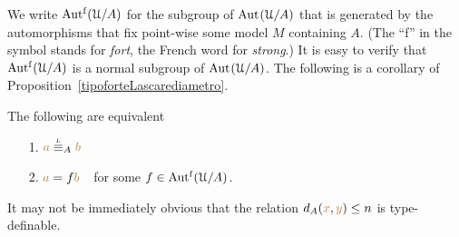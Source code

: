 We write \emph{$\mbox{Aut$^{\rm f}$}(\EuScript U/A)$\/} for the subgroup of ${\rm Aut\kern.15ex}(\EuScript U/A)$ that is generated by the automorphisms that fix point-wise some model $M$ containing $A$.
(The ``f'' in the symbol stands for \textit{fort\/}, the French word for \textit{strong}.) It is easy to verify that $\mbox{Aut$^{\rm f}$}(\EuScript U/A)$ is a normal subgroup of ${\rm Aut\kern.15ex}(\EuScript U/A)$.
The following is a corollary of Proposition~\ref{tipoforteLascarediametro}. 

\begin{corollary}
The following are equivalent
\begin{itemize}
 \item[1.] ${\mr a}\equivL_A{\mr b}$
 \item[2.] ${\color{brown} a}=f{\color{brown} b}$\ \ for some $f\in\mbox{Aut$^{\rm f}$}(\EuScript U/A)$.
\end{itemize}
\end{corollary}

% 

It may not be immediately obvious that the relation $d_A({\color{brown} x},{\color{brown} y})\le n$ is type-definable.

